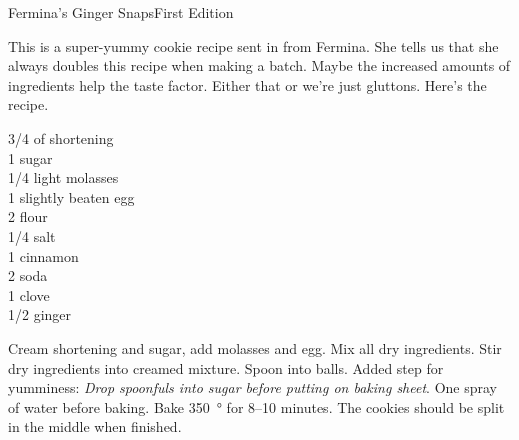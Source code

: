 \begin{entry}{Fermina's Ginger Snaps}{First Edition}

\begin{open}
  This is a super-yummy cookie recipe sent in from Fermina.  She tells us that
  she always doubles this recipe when making a batch. Maybe the increased
  amounts of ingredients help the taste factor.  Either that or we're just
  gluttons.  Here's the recipe.
\end{open}
\begin{ingredients}
  \SI{3/4}{\cup} of shortening \\
  \SI{1}{\cup} sugar \\
  \SI{1/4}{\cup} light molasses \\
  1 slightly beaten egg \\
  \SI{2}{\cup} flour \\
  \SI{1/4}{\teaspoon}  salt \\
  \SI{1}{\teaspoon}  cinnamon \\
  \SI{2}{\teaspoon} soda \\
  \SI{1}{\teaspoon}  clove \\
  \SI{1/2}{\teaspoon} ginger
\end{ingredients}
Cream shortening and sugar, add molasses and egg.  Mix all dry ingredients.
Stir dry ingredients into creamed mixture.  Spoon into balls. Added step for
yumminess: \textit{Drop spoonfuls into sugar before putting on baking sheet}.
One spray of water before baking.  Bake \SI{350}{\degree} for \numrange{8}{10}
minutes.  The cookies should be split in the middle when finished.
\end{entry}

